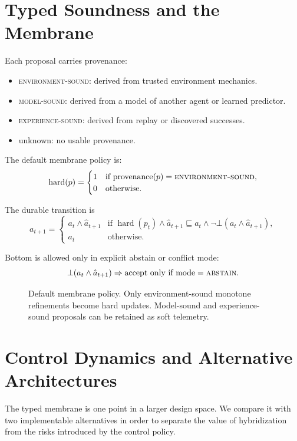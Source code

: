 \documentclass[11pt]{article}
\newcommand{\envsound}{\textsc{environment-sound}}
\newcommand{\modelsound}{\textsc{model-sound}}
\newcommand{\expsound}{\textsc{experience-sound}}
\begin{document}
\section{Typed Soundness and the Membrane}

Each proposal carries provenance:
\begin{itemize}
  \item \envsound: derived from trusted environment mechanics.
  \item \modelsound: derived from a model of another agent or learned predictor.
  \item \expsound: derived from replay or discovered successes.
  \item unknown: no usable provenance.
\end{itemize}

The default membrane policy is:
\[
\operatorname{hard}(p)=
\begin{cases}
1 & \text{if provenance}(p)=\envsound,\\
0 & \text{otherwise.}
\end{cases}
\]

The durable transition is
\[
a_{t+1} =
\begin{cases}
a_t \wedge \hat a_{t+1} &
\text{if } \operatorname{hard}(p_t)\land \hat a_{t+1}\sqsubseteq a_t
\land \neg\bot(a_t\wedge\hat a_{t+1}),\\
a_t & \text{otherwise.}
\end{cases}
\]

Bottom is allowed only in explicit abstain or conflict mode:
\[
  \bot(a_t \wedge \hat a_{t+1}) \Rightarrow
  \text{accept only if mode}=\textsc{abstain}.
\]

\begin{figure}[t]
\centering

\caption{Default membrane policy. Only environment-sound monotone refinements become hard updates. Model-sound and experience-sound proposals can be retained as soft telemetry.}
\label{fig:membrane}
\end{figure}

\section{Control Dynamics and Alternative Architectures}

The typed membrane is one point in a larger design space. We compare it with two implementable alternatives in order to separate the value of hybridization from the risks introduced by the control policy.
\end{document}
